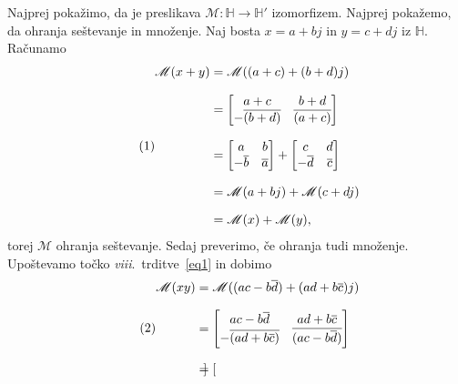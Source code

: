 \documentclass[mat1, tisk]{fmfdelo}
\numberwithin{equation}{section}
\begin{document}
\begin{dokaz}
    Najprej pokažimo, da je preslikava $\mathscr{M}: \mathbb{H} \rightarrow \mathbb{H}'$ izomorfizem. 
    Najprej pokažemo, da ohranja seštevanje in množenje.
    Naj bosta $x = a + bj$ in $y = c + dj$ iz $\mathbb{H}$. Računamo
    \begin{equation*}\tag{1}
        \setlength{\jot}{10pt}
            \begin{aligned}
                \mathscr{M}(x + y) &= \mathscr{M}((a + c) + (b + d)j) \\
                &= \begin{bmatrix}
                    a + c & b + d\\
                    - \overline{(b + d)} & \overline{(a + c)}
                \end{bmatrix} \\
                &= \begin{bmatrix}
                    a & b\\
                    - \overline{b} & \overline{a}
                \end{bmatrix}
                +
                \begin{bmatrix}
                    c & d\\
                    - \overline{d} & \overline{c}
                \end{bmatrix}\\
                &= \mathscr{M}(a+bj) + \mathscr{M}(c+dj)\\
                &= \mathscr{M}(x) + \mathscr{M}(y),
            \end{aligned}
    \end{equation*} torej $\mathscr{M}$ ohranja seštevanje. Sedaj preverimo, če ohranja tudi množenje. Upoštevamo točko \textit{viii}.\ trditve~\ref{eq1} in dobimo
    \begin{equation*}\tag{2}
        \setlength{\jot}{10pt}
            \begin{aligned}
                \mathscr{M}(xy) &= \mathscr{M}((ac - b\overline{d}) + (ad + b\overline{c})j) \\
                &= \begin{bmatrix}
                    ac - b\overline{d} & ad + b\overline{c}\\
                    - \overline{(ad + b\overline{c})} & \overline{(ac - b\overline{d})}
                \end{bmatrix} \\
                &= \begin{bmatrix}

\end{bmatrix}
\end{aligned}
\end{equation*}
\end{dokaz}
\end{document}
